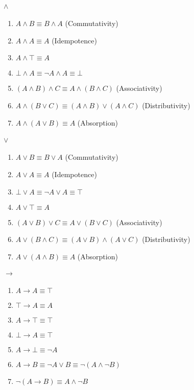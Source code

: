 \documentclass[10pt,twoside,twocolumn]{article}
\begin{document}
\paragraph{$\boldsymbol{\land}$}
\begin{enumerate}
\item $A\land B\equiv B\land A$ (Commutativity)
\item $A\land A\equiv A$ (Idempotence)
\item $A\land\top\equiv A$
\item $\bot\land A\equiv\lnot A\land A\equiv\bot$
\item $\left(A\land B\right)\land C\equiv A\land\left(B\land C\right)$
(Associativity)
\item $A\land\left(B\lor C\right)\equiv\left(A\land B\right)\lor\left(A\land C\right)$
(Distributivity)
\item $A\land\left(A\lor B\right)\equiv A$ (Absorption)
\end{enumerate}

\paragraph{$\boldsymbol{\lor}$}
\begin{enumerate}
\item $A\lor B\equiv B\lor A$ (Commutativity)
\item $A\lor A\equiv A$ (Idempotence)
\item $\bot\lor A\equiv\lnot A\lor A\equiv\top$
\item $A\lor\top\equiv A$
\item $\left(A\lor B\right)\lor C\equiv A\lor\left(B\lor C\right)$ (Associativity)
\item $A\lor\left(B\land C\right)\equiv\left(A\lor B\right)\land\left(A\lor C\right)$
(Distributivity)
\item $A\lor\left(A\land B\right)\equiv A$ (Absorption)
\end{enumerate}

\paragraph{$\boldsymbol{\rightarrow}$}
\begin{enumerate}
\item $A\rightarrow A\equiv\top$
\item $\top\rightarrow A\equiv A$
\item $A\rightarrow\top\equiv\top$
\item $\bot\rightarrow A\equiv\top$
\item $A\rightarrow\bot\equiv\lnot A$
\item $A\rightarrow B\equiv\lnot A\lor B\equiv\lnot\left(A\land\lnot B\right)$
\item $\lnot$$\left(A\rightarrow B\right)\equiv A\land\lnot B$
\end{enumerate}
\end{document}
